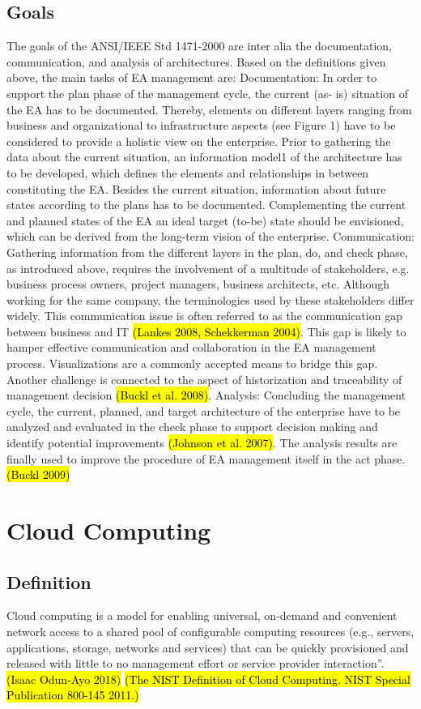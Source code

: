 \subsection{Goals}
The goals of the ANSI/IEEE Std 1471-2000 are inter alia the documentation, communication, and analysis of architectures. Based on the definitions given above, the main tasks of EA management are:
Documentation: In order to support the plan phase of the management cycle, the current (as- is) situation of the EA has to be documented. Thereby, elements on different layers ranging from business and organizational to infrastructure aspects (see Figure 1) have to be considered to provide a holistic view on the enterprise. Prior to gathering the data about the current situation, an information model1 of the architecture has to be developed, which defines the elements and relationships in between constituting the EA. Besides the current situation, information about future states according to the plans has to be documented. Complementing the current and planned states of the EA an ideal target (to-be) state should be envisioned, which can be derived from the long-term vision of the enterprise.
Communication: Gathering information from the different layers in the plan, do, and check phase, as introduced above, requires the involvement of a multitude of stakeholders, e.g. business process owners, project managers, business architects, etc. Although working for the same company, the terminologies used by these stakeholders differ widely. This communication issue is often referred to as the communication gap between business and IT \hl{(Lankes 2008, Schekkerman 2004)}. This gap is likely to hamper effective communication and collaboration in the EA management process. Visualizations are a commonly accepted means to bridge this gap. Another challenge is connected to the aspect of historization and traceability of management decision \hl{(Buckl et al. 2008)}. 
Analysis: Concluding the management cycle, the current, planned, and target architecture of the enterprise have to be analyzed and evaluated in the check phase to support decision making and identify potential improvements \hl{(Johnson et al. 2007)}. The analysis results are finally used to improve the procedure of EA management itself in the act phase.
\hl{(Buckl 2009)}

\section{Cloud Computing} 

\subsection{Definition}
Cloud computing is a model for enabling universal, on-demand and convenient network
access to a shared pool of configurable computing resources (e.g., servers, applications, storage, networks and services) that can be quickly provisioned and released with little to no management effort or service provider interaction”.
\hl{(Isaac Odun-Ayo 2018)}
\hl{(The NIST Definition of Cloud Computing. NIST Special Publication 800-145 2011.)}


